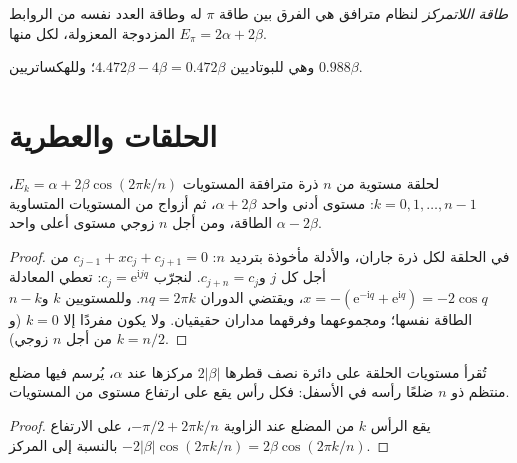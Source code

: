 \begin{definition}\label{def:b2:huckel:delocalisation}
\emph{طاقة اللاتمركز} لنظام مترافق
هي الفرق بين طاقة $\pi$ له وطاقة العدد نفسه من
الروابط المزدوجة المعزولة، لكل منها $E_\pi = 2\alpha + 2\beta$.
\end{definition}

وهي للبوتاديين $4.472\beta - 4\beta = 0.472\beta$؛ وللهكساتريين $0.988\beta$.

\section{الحلقات والعطرية}

\begin{theorem}\label{thm:b2:huckel:ring}
لحلقة مستوية من $n$ ذرة مترافقة المستويات $E_k = \alpha + 2\beta\cos(2\pi k/n)$،
$k = 0, 1, \dots, n - 1$: مستوى أدنى واحد $\alpha + 2\beta$، ثم أزواج من المستويات
المتساوية الطاقة، ومن أجل $n$ زوجي مستوى أعلى واحد $\alpha - 2\beta$.
\end{theorem}

\begin{proof}
في الحلقة لكل ذرة جاران، والأدلة مأخوذة بترديد $n$:
$c_{j-1} + xc_j + c_{j+1} = 0$ من أجل كل $j$ و$c_{j+n} = c_j$. لنجرّب $c_j = \mathrm e^{\mathrm
i jq}$: تعطي المعادلة $x = -(\mathrm e^{-\mathrm iq} + \mathrm e^{\mathrm iq}) = -2\cos q$،
ويقتضي الدوران $nq = 2\pi k$. وللمستويين $k$ و$n - k$ الطاقة
نفسها؛ ومجموعهما وفرقهما مداران حقيقيان. ولا يكون مفردًا إلا $k = 0$ (و$k = n/2$ من أجل
$n$ زوجي).
\end{proof}

\begin{corollary}\label{cor:b2:huckel:frost}
تُقرأ مستويات الحلقة على دائرة نصف قطرها $2|\beta|$ مركزها عند $\alpha$، يُرسم
فيها مضلع منتظم ذو $n$ ضلعًا رأسه في الأسفل: فكل رأس يقع
على ارتفاع مستوى من المستويات.
\end{corollary}

\begin{proof}
يقع الرأس $k$ من المضلع عند الزاوية $-\pi/2 + 2\pi k/n$، على الارتفاع
$-2|\beta|\cos(2\pi k/n) = 2\beta\cos(2\pi k/n)$ بالنسبة إلى المركز.
\end{proof}

